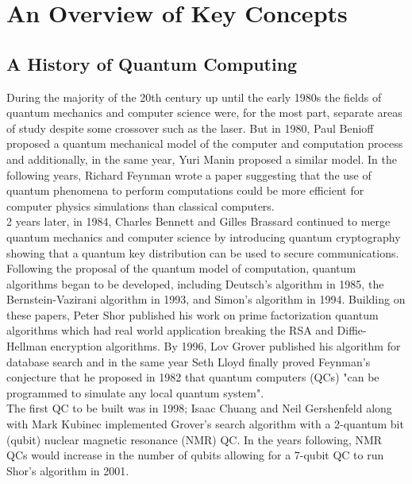 \documentclass[reqno]{amsart}
\numberwithin{equation}{section}
\numberwithin{figure}{section}
\begin{document}
\section{An Overview of Key Concepts}
\subsection{A History of Quantum Computing}
\begin{justify}
During the majority of the 20th century up until the early 1980s the fields of quantum mechanics and computer science were, for the most part, separate areas of study despite some crossover such as the laser. But in 1980, Paul Benioff proposed a quantum mechanical model of the computer and computation process \cite{Benioff1980} and additionally, in the same year, Yuri Manin proposed a similar model. \cite{Manin1980} In the following years, Richard Feynman wrote a paper suggesting that the use of quantum phenomena to perform computations could be more efficient for computer physics simulations than classical computers. \cite{Feynman1982} \\
2 years later, in 1984, Charles Bennett and Gilles Brassard continued to merge quantum mechanics and computer science by introducing quantum cryptography \cite{BennettBrassard1984} showing that a quantum key distribution can be used to secure communications. \\

Following the proposal of the quantum model of computation, quantum algorithms began to be developed, including Deutsch's algorithm in 1985, \cite{Deutsch1985} the Bernstein-Vazirani algorithm in 1993, \cite{BernsteinVazirani1993} and Simon's algorithm in 1994. \cite{Simon1994} Building on these papers, Peter Shor published his work on prime factorization quantum algorithms which had real world application breaking the RSA and Diffie-Hellman encryption algorithms. \cite{Shor1994} By 1996, Lov Grover published his algorithm for database search \cite{Grover1996} and in the same year Seth Lloyd finally proved Feynman's conjecture that he proposed in 1982 that quantum computers (QCs) "can be programmed to simulate any local quantum system". \cite{Lloyd1996} \\

The first QC to be built was in 1998; Isaac Chuang and Neil Gershenfeld along with Mark Kubinec implemented Grover's search algorithm with a 2-quantum bit (qubit) nuclear magnetic resonance (NMR) QC. \cite{ChuangGershefeldKubinec1998} In the years following, NMR QCs would increase in the number of qubits allowing for a 7-qubit QC to run Shor's algorithm in 2001. \cite{Vandersypen2001} \\


\end{justify}
\end{document}
